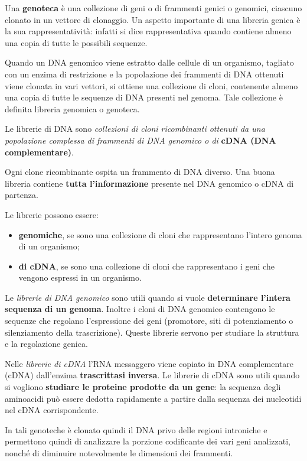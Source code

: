 \documentclass[11pt]{book}
\begin{document}
Una \textbf{genoteca} è una collezione di geni o di frammenti genici o
genomici, ciascuno clonato in un vettore di clonaggio. Un aspetto
importante di una libreria genica è la sua rappresentatività: infatti si
dice rappresentativa quando contiene almeno una copia di tutte le
possibili sequenze.

Quando un DNA genomico viene estratto dalle cellule di un organismo,
tagliato con un enzima di restrizione e la popolazione dei frammenti di
DNA ottenuti viene clonata in vari vettori, si ottiene una collezione di
cloni, contenente almeno una copia di tutte le sequenze di DNA presenti
nel genoma. Tale collezione è definita libreria genomica o genoteca.

Le librerie di DNA sono \emph{collezioni di cloni ricombinanti ottenuti
da una popolazione complessa di frammenti di DNA genomico o di}
\textbf{cDNA (DNA complementare)}.

Ogni clone ricombinante ospita un frammento di DNA diverso. Una buona
libreria contiene \textbf{tutta l'informazione} presente nel DNA
genomico o cDNA di partenza.

Le librerie possono essere:

\begin{itemize}
\itemsep1pt\parskip0pt
\item
  \textbf{genomiche}, se sono una collezione di cloni che rappresentano
  l'intero genoma di un organismo;
\item
  \textbf{di cDNA}, se sono una collezione di cloni che rappresentano i
  geni che vengono espressi in un organismo.
\end{itemize}

Le \emph{librerie di DNA genomico} sono utili quando si vuole
\textbf{determinare l'intera sequenza di un genoma}. Inoltre i cloni di
DNA genomico contengono le sequenze che regolano l'espressione dei geni
(promotore, siti di potenziamento o silenziamento della trascrizione).
Queste librerie servono per studiare la struttura e la regolazione
genica.

Nelle \emph{librerie di cDNA} l'RNA messaggero viene copiato in DNA
complementare (cDNA) dall'enzima \textbf{trascrittasi inversa}. Le
librerie di cDNA sono utili quando si vogliono \textbf{studiare le
proteine prodotte da un gene}: la sequenza degli aminoacidi può essere
dedotta rapidamente a partire dalla sequenza dei nucleotidi nel cDNA
corrispondente.

In tali genoteche è clonato quindi il DNA privo delle regioni introniche
e permettono quindi di analizzare la porzione codificante dei vari geni
analizzati, nonché di diminuire notevolmente le dimensioni dei
frammenti.
\end{document}
